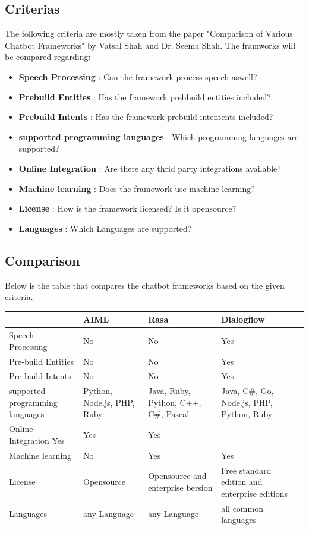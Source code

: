 \documentclass[10pt,final,journal,a4paper,oneside,twocolumn]{IEEEtran}
\begin{document}
\subsection{Criterias}
The following criteria are mostly taken from the paper "Comparison of Various Chatbot Frameworks" by Vatsal Shah and Dr. Seema Shah. \cite{b31} The framworks will be compared regarding:
\begin{itemize}
\item \textbf{Speech Processing} : Can the framework process speech aswell?
\item \textbf{Prebuild Entities} : Has the framework prebbuild entities included?
\item \textbf{Prebuild  Intents} : Has the framework prebuild intentents included?
\item \textbf{supported programming languages} : Which programming languages are supported?
\item \textbf{Online Integration} : Are there any thrid party integrations available?
\item \textbf{Machine learning} : Does the framework use machine learning?
\item \textbf{License} : How is the framework licensed? Is it opensource?
\item \textbf{Languages} : Which Languages are supported?
\end{itemize}

\subsection{Comparison}
Below is the table that compares the chatbot frameworks based on the given criteria.
\begin{tabularx}{0.45\textwidth}{|p{}|X|X|X|X}
\hline
& AIML & Rasa & Dialogflow \\
\hline
Speech Processing & No & No & Yes\\
\hline
Pre-build Entities & No & No & Yes\\
\hline
Pre-build Intents & No & No & Yes\\
\hline
supported programming languages & Python, Node.js, PHP, Ruby & Java, Ruby, Python, C++, C\#, Pascal & Java, C\#, Go, Node.js, PHP, Python, Ruby\\
\hline
Online Integration Yes & Yes & Yes &\\
\hline
Machine learning & No & Yes & Yes\\
\hline
License & Opensource & Opensource and enterprise bersion & Free standard edition and enterprise editions\\
\hline
Languages & any Language & any Language & all common languages\\
\hline
\end{tabularx}
\end{document}
